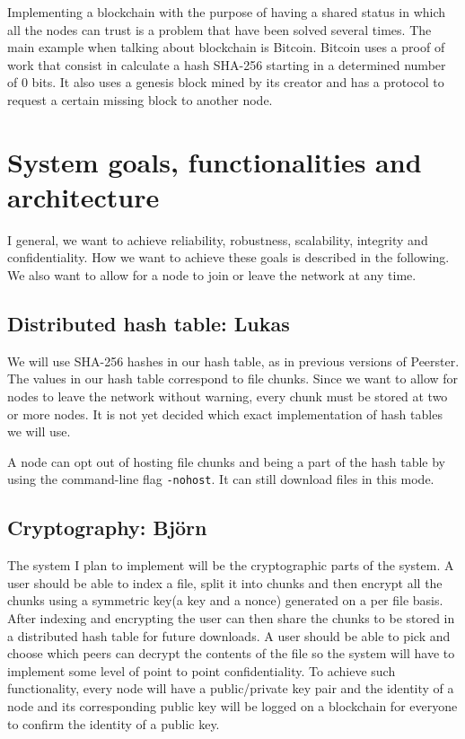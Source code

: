 \documentclass[12pt,a4paper,draft]{article}
\begin{document}
Implementing a blockchain with the purpose of having a shared status in which all the nodes can trust is a problem that have been solved several times. The main example when talking about blockchain is Bitcoin. Bitcoin uses a proof of work that consist in calculate a hash SHA-256 starting in a determined number of 0 bits. It also uses a genesis block mined by its creator and has a protocol to request a certain missing block to another node.

\section{System goals, functionalities and architecture}

I general, we want to achieve reliability, robustness, scalability, integrity and confidentiality.
How we want to achieve these goals is described in the following.
We also want to allow for a node to join or leave the network at any time.

\subsection{Distributed hash table: Lukas}

We will use SHA-256 hashes in our hash table, as in previous versions of Peerster.
The values in our hash table correspond to file chunks.
Since we want to allow for nodes to leave the network without warning, every chunk must be stored at two or more nodes.
It is not yet decided which exact implementation of hash tables we will use.

A node can opt out of hosting file chunks and being a part of the hash table by using the command-line flag \texttt{-nohost}.
It can still download files in this mode.

\subsection{Cryptography: Björn}

The system I plan to implement will be the cryptographic parts of the system. A user should be able to index a file, split it into chunks and then encrypt all the chunks using a symmetric key(a key and a nonce) generated on a per file basis. After indexing and encrypting the user can then share the chunks to be stored in a distributed hash table for future downloads. A user should be able to pick and choose which peers can decrypt the contents of the file so the system will have to implement some level of point to point confidentiality. To achieve such functionality, every node will have a public/private key pair and the identity of a node and its corresponding public key will be logged on a blockchain for everyone to confirm the identity of a public key.
\end{document}
